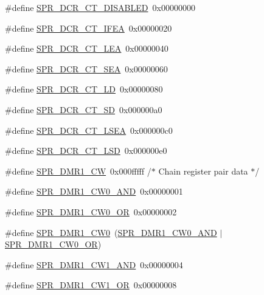 \begin{DoxyCompactItemize}
\#define \hyperlink{spr-defs_8h_a85033f5ae6c05889c10829ec7d75cdcd}{\-S\-P\-R\-\_\-\-D\-C\-R\-\_\-\-C\-T\-\_\-\-D\-I\-S\-A\-B\-L\-E\-D}~0x00000000
\item 
\#define \hyperlink{spr-defs_8h_a3a5358a658a49a390e3ab5f7e8147579}{\-S\-P\-R\-\_\-\-D\-C\-R\-\_\-\-C\-T\-\_\-\-I\-F\-E\-A}~0x00000020
\item 
\#define \hyperlink{spr-defs_8h_a6cb3af1bbc3e388b005db818fe6f71cf}{\-S\-P\-R\-\_\-\-D\-C\-R\-\_\-\-C\-T\-\_\-\-L\-E\-A}~0x00000040
\item 
\#define \hyperlink{spr-defs_8h_a2e085726604bfbee1df49bcff6e460b4}{\-S\-P\-R\-\_\-\-D\-C\-R\-\_\-\-C\-T\-\_\-\-S\-E\-A}~0x00000060
\item 
\#define \hyperlink{spr-defs_8h_a807474def3f9cdf4715384a08c14fc2c}{\-S\-P\-R\-\_\-\-D\-C\-R\-\_\-\-C\-T\-\_\-\-L\-D}~0x00000080
\item 
\#define \hyperlink{spr-defs_8h_a1b915596851a741535d3bb661cb2ed62}{\-S\-P\-R\-\_\-\-D\-C\-R\-\_\-\-C\-T\-\_\-\-S\-D}~0x000000a0
\item 
\#define \hyperlink{spr-defs_8h_acde9365abd4f51f2ae9f8c4e7d16ece5}{\-S\-P\-R\-\_\-\-D\-C\-R\-\_\-\-C\-T\-\_\-\-L\-S\-E\-A}~0x000000c0
\item 
\#define \hyperlink{spr-defs_8h_a03d5c755600029e2e3d0edc10824c414}{\-S\-P\-R\-\_\-\-D\-C\-R\-\_\-\-C\-T\-\_\-\-L\-S\-D}~0x000000e0
\item 
\#define \hyperlink{spr-defs_8h_a8e6d072742e8456de4a69467a6957a1e}{\-S\-P\-R\-\_\-\-D\-M\-R1\-\_\-\-C\-W}~0x000fffff  /$\ast$ Chain register pair data $\ast$/
\item 
\#define \hyperlink{spr-defs_8h_a48a15bbea7aa24b3ad3e35e065f3cf4a}{\-S\-P\-R\-\_\-\-D\-M\-R1\-\_\-\-C\-W0\-\_\-\-A\-N\-D}~0x00000001
\item 
\#define \hyperlink{spr-defs_8h_a4fea5a655e31322a88d989281c68fca6}{\-S\-P\-R\-\_\-\-D\-M\-R1\-\_\-\-C\-W0\-\_\-\-O\-R}~0x00000002
\item 
\#define \hyperlink{spr-defs_8h_a88c4da1f4fed7062c6cacb0ccf02f53b}{\-S\-P\-R\-\_\-\-D\-M\-R1\-\_\-\-C\-W0}~(\hyperlink{spr-defs_8h_a48a15bbea7aa24b3ad3e35e065f3cf4a}{\-S\-P\-R\-\_\-\-D\-M\-R1\-\_\-\-C\-W0\-\_\-\-A\-N\-D} $|$ \hyperlink{spr-defs_8h_a4fea5a655e31322a88d989281c68fca6}{\-S\-P\-R\-\_\-\-D\-M\-R1\-\_\-\-C\-W0\-\_\-\-O\-R})
\item 
\#define \hyperlink{spr-defs_8h_a4d0eeeca3feb5fd4553ca7512e0153ad}{\-S\-P\-R\-\_\-\-D\-M\-R1\-\_\-\-C\-W1\-\_\-\-A\-N\-D}~0x00000004
\item 
\#define \hyperlink{spr-defs_8h_aa0da9be6e49302d7d11cfeba766cc1e8}{\-S\-P\-R\-\_\-\-D\-M\-R1\-\_\-\-C\-W1\-\_\-\-O\-R}~0x00000008

\end{DoxyCompactItemize}
